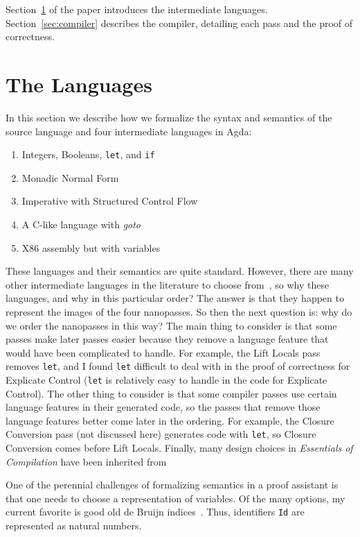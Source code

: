 \documentclass[sigplan,review,dvipsnames,screen,10pt]{acmart}
\begin{document}
Section~\ref{sec:langs} of the paper introduces the intermediate
languages. Section~\ref{sec:compiler} describes the compiler,
detailing each pass and the proof of correctness.

\section{The Languages}
\label{sec:langs}

In this section we describe how we formalize the syntax and semantics
of the source language and four intermediate languages in Agda:
\begin{enumerate}
\item Integers, Booleans, \texttt{let}, and \texttt{if}
\item Monadic Normal Form
\item Imperative with Structured Control Flow
\item A C-like language with \emph{goto}
\item X86 assembly but with variables
\end{enumerate}
These languages and their semantics are quite standard. However, there
are many other intermediate languages in the literature to choose
from~\citep{Flanagan:1993cg,Hatcliff:1994vn,Kelsey:1995uq,Birkedal:1996aa},
so why these languages, and why in this particular order?  The answer
is that they happen to represent the images of the four nanopasses.
So then the next question is: why do we order the nanopasses in this
way? The main thing to consider is that some passes make later passes
easier because they remove a language feature that would have been
complicated to handle. For example, the Lift Locals pass removes
\texttt{let}, and I found \texttt{let} difficult to deal with in the
proof of correctness for Explicate Control (\texttt{let} is relatively
easy to handle in the code for Explicate Control). The other thing to
consider is that some compiler passes use certain language features in
their generated code, so the passes that remove those language
features better come later in the ordering.  For example, the Closure
Conversion pass (not discussed here) generates code with \texttt{let},
so Closure Conversion comes before Lift Locals. Finally, many design
choices in \emph{Essentials of Compilation} have been inherited from
\citet{Dybvig:2010aa}

One of the perennial challenges of formalizing semantics in a proof
assistant is that one needs to choose a representation of variables.
Of the many options, my current favorite is good old de Bruijn
indices~\citep{Bruijn:1972kx}.  Thus, identifiers \lstinline{Id} are
represented as natural numbers.
\end{document}
